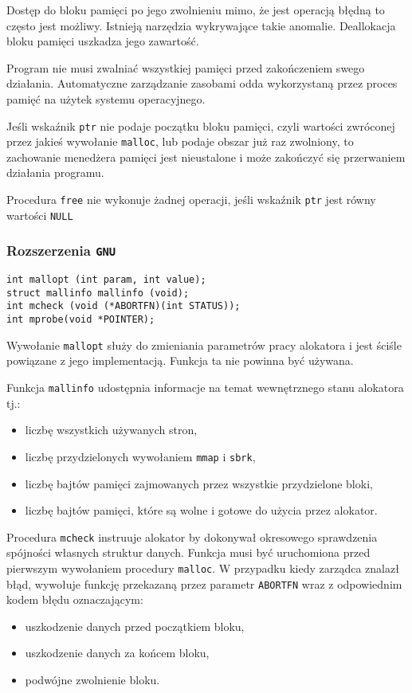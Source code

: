 \documentclass[12pt,a4paper,titlepage,twoside]{mwart}
\begin{document}
Dostęp do bloku pamięci po jego zwolnieniu mimo, że jest operacją błędną to
często jest możliwy. Istnieją narzędzia wykrywające takie anomalie. Deallokacja
bloku pamięci uszkadza jego zawartość.

Program nie musi zwalniać wszystkiej pamięci przed zakończeniem swego
działania. Automatyczne zarządzanie zasobami odda wykorzystaną przez proces
pamięć na użytek systemu operacyjnego.

Jeśli wskaźnik \texttt{ptr} nie podaje początku bloku pamięci, czyli wartości
zwróconej przez jakieś wywołanie \texttt{malloc}, lub podaje obszar już raz
zwolniony, to zachowanie menedżera pamięci jest nieustalone i może
zakończyć się przerwaniem działania programu.

Procedura \texttt{free} nie wykonuje żadnej operacji, jeśli wskaźnik
\texttt{ptr} jest równy wartości \texttt{NULL}

\subsubsection{Rozszerzenia \texttt{GNU}}

\vspace{2ex}
\begin{lstlisting}[caption={Prototypy pozostałych procedur i zmiennych.}]
int mallopt (int param, int value);
struct mallinfo mallinfo (void);
int mcheck (void (*ABORTFN)(int STATUS));
int mprobe(void *POINTER);
\end{lstlisting}

Wywołanie \texttt{mallopt} służy do zmieniania parametrów pracy alokatora i
jest ściśle powiązane z jego implementacją. Funkcja ta nie powinna być używana.

Funkcja \texttt{mallinfo} udostępnia informacje na temat wewnętrznego stanu
alokatora tj.: 
\begin{itemize}
\item liczbę wszystkich używanych stron,
\item liczbę przydzielonych wywołaniem \texttt{mmap} i \texttt{sbrk},
\item liczbę bajtów pamięci zajmowanych przez wszystkie przydzielone bloki,
\item liczbę bajtów pamięci, które są wolne i gotowe do użycia przez alokator.
\end{itemize}

Procedura \texttt{mcheck} instruuje alokator by dokonywał okresowego
sprawdzenia spójności własnych struktur danych. Funkcja musi być uruchomiona
przed pierwszym wywołaniem procedury \texttt{malloc}. W przypadku kiedy
zarządca znalazł błąd, wywołuje funkcję przekazaną przez parametr
\texttt{ABORTFN} wraz z odpowiednim kodem błędu oznaczającym:
\begin{itemize}
\item uszkodzenie danych przed początkiem bloku,
\item uszkodzenie danych za końcem bloku,
\item podwójne zwolnienie bloku.
\end{itemize}
\end{document}
